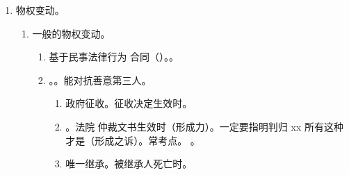 \begin{enumerate}
\begin{enumerate}
\begin{enumerate}
                        \begin{kk}{占有改定。所有人变占有人}
                          \begin{enumerate}
                            \item 典型。先卖后租/借。。
                            \item {}。
                            \item {}。
                            \item {}。
                          \end{enumerate}
                        \end{kk}
                  \item 拟制交付。将标的物的权利凭证（）交给受让人。
                \end{enumerate}
        \end{enumerate}
  \item 物权变动。
        \begin{enumerate}
          \item 一般的物权变动。
                \begin{enumerate}
                  \item 基于民事法律行为 \hz 合同（）。。
                  \item {}。。能对抗善意第三人。
                        \begin{enumerate}
                          \item 政府征收。征收决定生效时。
                          \item {}。法院 \hz 仲裁文书生效时（形成力）。一定要指明判归 xx 所有这种才是（形成之诉）。常考点。
                                。
                          \item 唯一继承。被继承人死亡时。

\end{enumerate}
\end{enumerate}
\end{enumerate}
\end{enumerate}
